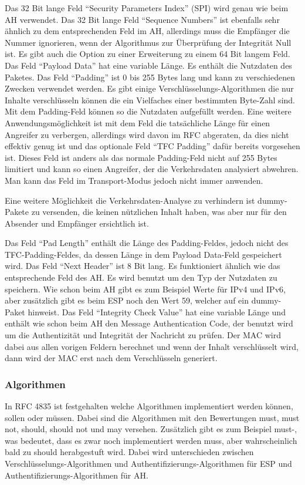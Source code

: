 \documentclass[12pt]{scrartcl}
\begin{document}
Das 32 Bit lange Feld "`Security Parameters Index"' (SPI) wird genau wie beim AH verwendet. Das 32 Bit lange Feld "`Sequence Numbers"' ist ebenfalls sehr ähnlich zu dem entsprechenden Feld im AH, allerdings muss die Empfänger die Nummer ignorieren, wenn der Algorithmus zur Überprüfung der Integrität Null ist. Es gibt auch die Option zu einer Erweiterung zu einem 64 Bit langem Feld. Das Feld "`Payload Data"' hat eine variable Länge. Es enthält die Nutzdaten des Paketes. Das Feld "`Padding"' ist 0 bis 255 Bytes lang und kann zu verschiedenen Zwecken verwendet werden. Es gibt einige Verschlüsselungs-Algorithmen die nur Inhalte verschlüsseln können die ein Vielfaches einer bestimmten Byte-Zahl sind. Mit dem Padding-Feld können so die Nutzdaten aufgefüllt werden. Eine weitere Anwendungsmöglichkeit ist mit dem Feld die tatsächliche Länge für einen Angreifer zu verbergen, allerdings wird davon im RFC abgeraten, da dies nicht effektiv genug ist und das optionale Feld "`TFC Padding"' dafür bereits vorgesehen ist. Dieses Feld ist anders als das normale Padding-Feld nicht auf 255 Bytes limitiert und kann so einen Angreifer, der die Verkehrsdaten analysiert abwehren. Man kann das Feld im Transport-Modus jedoch nicht immer anwenden. 

Eine weitere Möglichkeit die Verkehrsdaten-Analyse zu verhindern ist dummy-Pakete zu versenden, die keinen nützlichen Inhalt haben, was aber nur für den Absender und Empfänger ersichtlich ist.

Das Feld "`Pad Length"' enthält die Länge des Padding-Feldes, jedoch nicht des TFC-Padding-Feldes, da dessen Länge in dem Payload Data-Feld gespeichert wird.%
Das Feld "`Next Header"' ist 8 Bit lang. Es funktioniert ähnlich wie das entsprechende Feld des AH. Es wird benutzt um den Typ der Nutzdaten zu speichern. Wie schon beim AH gibt es zum Beispiel Werte für IPv4 und IPv6, aber zusätzlich gibt es beim ESP noch den Wert 59, welcher auf ein dummy-Paket hinweist. Das Feld "`Integrity Check Value"' hat eine variable Länge und enthält wie schon beim AH den Message Authentication Code, der benutzt wird um die Authentizität und Integrität der Nachricht zu prüfen. Der MAC wird dabei aus allen vorigen Feldern berechnet und wenn der Inhalt verschlüsselt wird, dann wird der MAC erst nach dem Verschlüsseln generiert. 

\subsubsection{Algorithmen}
In RFC 4835 ist festgehalten welche Algorithmen implementiert werden können, sollen oder müssen. Dabei sind die Algorithmen mit den Bewertungen must, must not, should, should not und may versehen. Zusätzlich gibt es zum Beispiel must-, was bedeutet, dass es zwar noch implementiert werden muss, aber wahrscheinlich bald zu should herabgestuft wird. Dabei wird unterschieden zwischen Verschlüsselungs-Algorithmen und Authentifizierungs-Algorithmen für ESP und Authentifizierungs-Algorithmen für AH.
\end{document}
